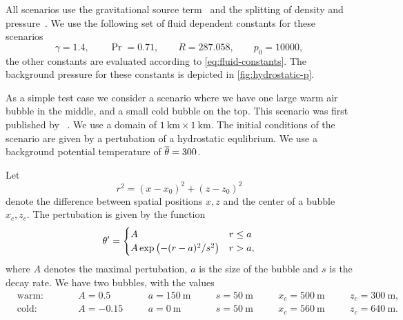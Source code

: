 All scenarios use the gravitational source term~ and the splitting of density and pressure~.
We use the following set of fluid dependent constants for these scenarios
\begin{equation}\label{eq:atmosphere-constants}
    \gamma = 1.4 ,\qquad \Pr =  0.71 ,\qquad R = 287.058 ,\qquad p_0 = 10000,
\end{equation}
the other constants are evaluated according to \cref{eq:fluid-constants}.
The background pressure for these constants is depicted in \cref{fig:hydrostatic-p}.


As a simple test case we consider a scenario where we have one large warm air bubble in the middle, and a small cold bubble on the top.
This scenario was first published by \citeauthor{robert1993bubble}~\cite{robert1993bubble}.
We use a domain of $\SI{1}{\km} \times \SI{1}{\km}$.
The initial conditions of the scenario are given by a pertubation of a hydrostatic equlibrium.
We use a background potential temperature of $\overline{\theta} = 300$.

Let
\begin{equation}
  \label{eq:radius}
  r^2 = (x - x_0)^2 + (z - z_0)^2
\end{equation}
denote the difference between spatial positions $x,z$ and the center of a bubble $x_c, z_c$.
The pertubation is given by the function
\begin{equation}
  \label{eq:bubbles-pertubation}
  \theta' =
  \begin{cases}
    A & r \leq a \\
    A \exp \left( - (r-a)^2/s^2 \right) & r > a,
    \end{cases}
\end{equation}
where $A$ denotes the maximal pertubation, $a$ is the size of the bubble and $s$ is the decay rate.
We have two bubbles, with the values
\begin{equation}
  \label{eq:bubbles-values}
\begin{alignedat}{6}
  & \text{warm:} \qquad && A = 0.5 \quad&& a = \SI{150}{\m} \quad&& s = \SI{50}{\m} \quad&& x_c = \SI{500}{\m} \quad&& z_c = \SI{300}{\m},\\
  & \text{cold:} \qquad && A = -0.15 \quad&& a = \SI{0}{\m} \quad&& s = \SI{50}{\m} \quad&& x_c = \SI{560}{\m} \quad&& z_c = \SI{640}{\m}.
  \end{alignedat}
\end{equation}

